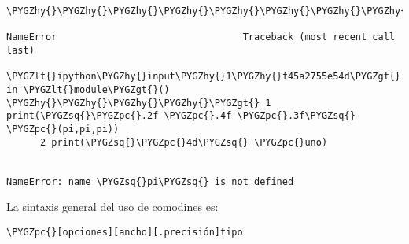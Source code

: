 \documentclass[a4paper,12pt,spanish]{sphinxmanual}
\def\PYGZlt{\char`\<}
\def\PYGZgt{\char`\>}
\def\PYGZpc{\char`\%}
\def\PYGZhy{\char`\-}
\def\PYGZsq{\char`\'}
\renewcommand\PYGZsq{\textquotesingle}
\begin{document}
\begin{Verbatim}[commandchars=\\\{\}]
\PYGZhy{}\PYGZhy{}\PYGZhy{}\PYGZhy{}\PYGZhy{}\PYGZhy{}\PYGZhy{}\PYGZhy{}\PYGZhy{}\PYGZhy{}\PYGZhy{}\PYGZhy{}\PYGZhy{}\PYGZhy{}\PYGZhy{}\PYGZhy{}\PYGZhy{}\PYGZhy{}\PYGZhy{}\PYGZhy{}\PYGZhy{}\PYGZhy{}\PYGZhy{}\PYGZhy{}\PYGZhy{}\PYGZhy{}\PYGZhy{}\PYGZhy{}\PYGZhy{}\PYGZhy{}\PYGZhy{}\PYGZhy{}\PYGZhy{}\PYGZhy{}\PYGZhy{}\PYGZhy{}\PYGZhy{}\PYGZhy{}\PYGZhy{}\PYGZhy{}\PYGZhy{}\PYGZhy{}\PYGZhy{}\PYGZhy{}\PYGZhy{}\PYGZhy{}\PYGZhy{}\PYGZhy{}\PYGZhy{}\PYGZhy{}\PYGZhy{}\PYGZhy{}\PYGZhy{}\PYGZhy{}\PYGZhy{}\PYGZhy{}\PYGZhy{}\PYGZhy{}\PYGZhy{}\PYGZhy{}\PYGZhy{}\PYGZhy{}\PYGZhy{}\PYGZhy{}\PYGZhy{}\PYGZhy{}\PYGZhy{}\PYGZhy{}\PYGZhy{}\PYGZhy{}\PYGZhy{}\PYGZhy{}\PYGZhy{}\PYGZhy{}\PYGZhy{}

NameError                                 Traceback (most recent call last)

\PYGZlt{}ipython\PYGZhy{}input\PYGZhy{}1\PYGZhy{}f45a2755e54d\PYGZgt{} in \PYGZlt{}module\PYGZgt{}()
\PYGZhy{}\PYGZhy{}\PYGZhy{}\PYGZhy{}\PYGZgt{} 1 print(\PYGZsq{}\PYGZpc{}.2f \PYGZpc{}.4f \PYGZpc{}.3f\PYGZsq{} \PYGZpc{}(pi,pi,pi))
      2 print(\PYGZsq{}\PYGZpc{}4d\PYGZsq{} \PYGZpc{}uno)


NameError: name \PYGZsq{}pi\PYGZsq{} is not defined
\end{Verbatim}

La sintaxis general del uso de comodines es:

\begin{Verbatim}[commandchars=\\\{\}]
\PYGZpc{}[opciones][ancho][.precisión]tipo
\end{Verbatim}
\end{document}
